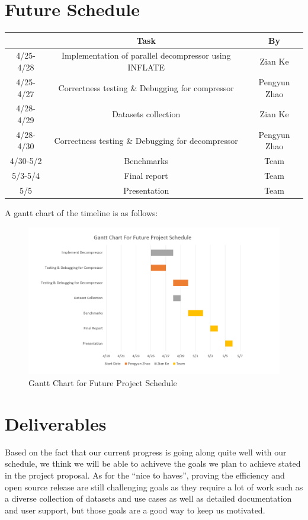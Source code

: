 \documentclass{article}
\begin{document}
\section{Future Schedule}
\begin{table}[!hbp]
\begin{center}
\begin{tabular}{|c|c|c|}
\hline
 & Task & By\\ \hline
4/25-4/28 & Implementation of parallel decompressor using INFLATE & Zian Ke \\ \hline
4/25-4/27 & Correctness testing \& Debugging for compressor & Pengyun Zhao\\ \hline
4/28-4/29 & Datasets collection & Zian Ke \\ \hline
4/28-4/30 & Correctness testing \& Debugging for decompressor & Pengyun Zhao\\ \hline
4/30-5/2 & Benchmarks & Team\\ \hline
5/3-5/4 & Final report & Team\\ \hline
5/5 & Presentation & Team\\ \hline
\end{tabular}
\end{center}
\end{table}
A gantt chart of the timeline is as follows:
\newpage
\begin{figure}[!h]
    \begin{center}
        \includegraphics[width = 15cm]{gantt.png}
        \caption{Gantt Chart for Future Project Schedule}
    \end{center}
\end{figure}

\section{Deliverables}
Based on the fact that our current progress is going along quite well with our schedule, we think we will be able to achiveve the goals we plan to achieve stated in the project proposal. As for the ``nice to haves'', proving the efficiency and open source release are still challenging goals as they require a lot of work such as a diverse collection of datasets and use cases as well as detailed documentation and user support, but those goals are a good way to keep us motivated.
\end{document}
